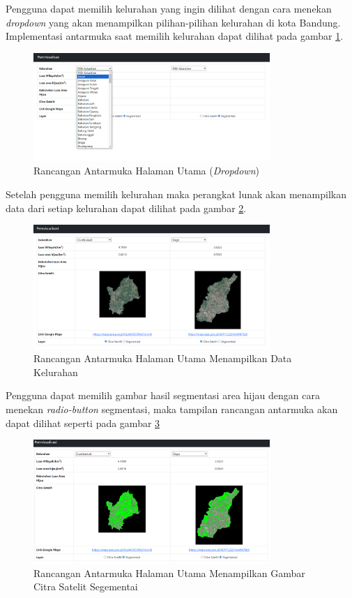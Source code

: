 Pengguna dapat memilih kelurahan yang ingin dilihat dengan cara menekan \textit{dropdown} yang akan menampilkan pilihan-pilihan kelurahan di kota Bandung. Implementasi antarmuka saat memilih kelurahan dapat dilihat pada  gambar \ref{fig:home2}.
\begin{figure}[H]
	\centering
	\includegraphics[width=0.8\textwidth]{Gambar/home2.png}
	\caption{Rancangan Antarmuka Halaman Utama (\textit{Dropdown})}
	\label{fig:home2}
\end{figure} 
Setelah pengguna memilih kelurahan maka perangkat lunak akan menampilkan data dari setiap kelurahan dapat dilihat pada gambar \ref{fig:home3}.
\begin{figure}[H]
	\centering
	\includegraphics[width=0.8\textwidth]{Gambar/home3.png}
	\caption{Rancangan Antarmuka Halaman Utama Menampilkan Data Kelurahan}
	\label{fig:home3}
\end{figure} 
Pengguna dapat memilih gambar hasil segmentasi area hijau dengan cara menekan \textit{radio-button} segmentasi,  maka tampilan rancangan antarmuka akan dapat dilihat seperti pada gambar \ref{fig:home5}
\begin{figure}[H]
	\centering
	\includegraphics[width=0.8\textwidth]{Gambar/home5.png}
	\caption{Rancangan Antarmuka Halaman Utama Menampilkan Gambar Citra Satelit Segementai}
	\label{fig:home5}
\end{figure} 

